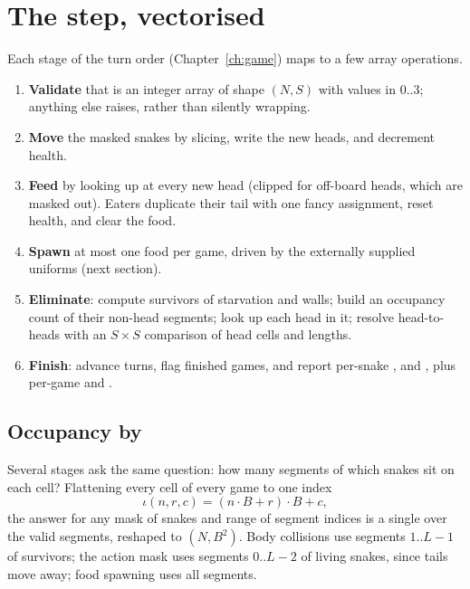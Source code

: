 \section{The step, vectorised}

Each stage of the turn order (Chapter~\ref{ch:game}) maps to a few array operations.

\begin{algbox}
\begin{enumerate}
\item \textbf{Validate} that  is an integer array of shape $(N,S)$ with
  values in $0..3$; anything else raises, rather than silently wrapping.
\item \textbf{Move} the masked snakes by slicing, write the new heads, and decrement
  health.
\item \textbf{Feed} by looking up  at every new head (clipped
  for off-board heads, which are masked out). Eaters duplicate their tail with one fancy
  assignment, reset health, and clear the food.
\item \textbf{Spawn} at most one food per game, driven by the externally supplied
  uniforms  (next section).
\item \textbf{Eliminate}: compute survivors of starvation and walls; build an occupancy
  count of their non-head segments; look up each head in it; resolve head-to-heads with an
  $S\times S$ comparison of head cells and lengths.
\item \textbf{Finish}: advance turns, flag finished games, and report per-snake
  ,  and , plus per-game  and
  .
\end{enumerate}
\end{algbox}

\subsection{Occupancy by }

Several stages ask the same question: how many segments of which snakes sit on each cell?
Flattening every cell of every game to one index
\[
  \iota(n, r, c) = (n\cdot B + r)\cdot B + c,
\]
the answer for any mask of snakes and range of segment indices is a single
 over the valid segments, reshaped to $(N, B^2)$. Body collisions use
segments $1..L{-}1$ of survivors; the action mask uses segments $0..L{-}2$ of living
snakes, since tails move away; food spawning uses all segments.


